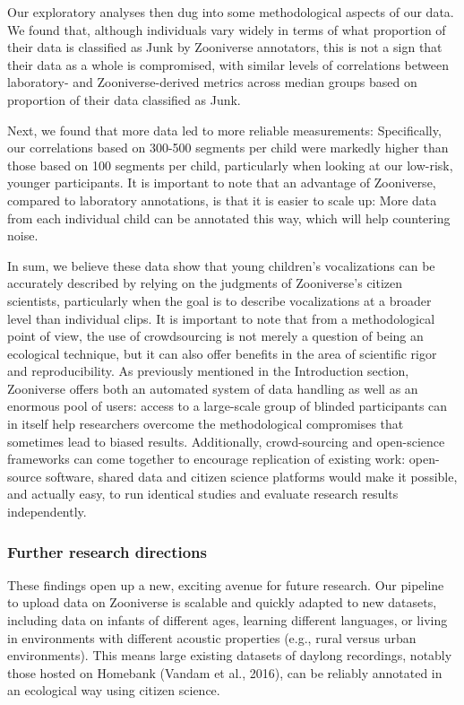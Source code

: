 \documentclass[english,,man]{apa6}
\begin{document}
Our exploratory analyses then dug into some methodological aspects of our data. We found that, although individuals vary widely in terms of what proportion of their data is classified as Junk by Zooniverse annotators, this is not a sign that their data as a whole is compromised, with similar levels of correlations between laboratory- and Zooniverse-derived metrics across median groups based on proportion of their data classified as Junk.

Next, we found that more data led to more reliable measurements: Specifically, our correlations based on 300-500 segments per child were markedly higher than those based on 100 segments per child, particularly when looking at our low-risk, younger participants. It is important to note that an advantage of Zooniverse, compared to laboratory annotations, is that it is easier to scale up: More data from each individual child can be annotated this way, which will help countering noise.

In sum, we believe these data show that young children's vocalizations can be accurately described by relying on the judgments of Zooniverse's citizen scientists, particularly when the goal is to describe vocalizations at a broader level than individual clips. It is important to note that from a methodological point of view, the use of crowdsourcing is not merely a question of being an ecological technique, but it can also offer benefits in the area of scientific rigor and reproducibility. As previously mentioned in the Introduction section, Zooniverse offers both an automated system of data handling as well as an enormous pool of users: access to a large-scale group of blinded participants can in itself help researchers overcome the methodological compromises that sometimes lead to biased results. Additionally, crowd-sourcing and open-science frameworks can come together to encourage replication of existing work: open-source software, shared data and citizen science platforms would make it possible, and actually easy, to run identical studies and evaluate research results independently.

\hypertarget{further-research-directions}{%
\subsubsection{Further research directions}\label{further-research-directions}}

These findings open up a new, exciting avenue for future research. Our pipeline to upload data on Zooniverse is scalable and quickly adapted to new datasets, including data on infants of different ages, learning different languages, or living in environments with different acoustic properties (e.g., rural versus urban environments). This means large existing datasets of daylong recordings, notably those hosted on Homebank (Vandam et al., 2016), can be reliably annotated in an ecological way using citizen science.
\end{document}
